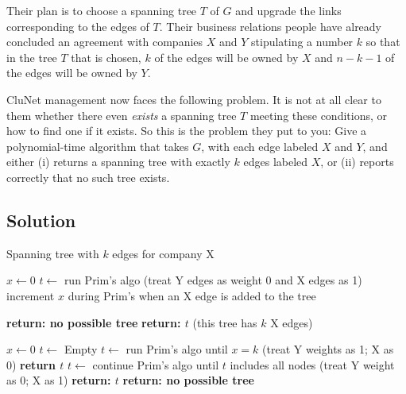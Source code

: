 \documentclass[11pt]{article}
\begin{document}
Their plan is to choose a spanning tree $T$ of $G$ and upgrade the links corresponding to the edges of $T$. Their business relations people have already concluded an agreement with companies $X$ and $Y$ stipulating a number $k$ so that in the tree $T$ that is chosen, $k$ of the edges will be owned by $X$ and $n-k-1$ of the edges will be owned by $Y$.

CluNet management now faces the following problem. It is not at all clear to them whether there even \textit{exists} a spanning tree $T$ meeting these conditions, or how to find one if it exists. So this is the problem they put to you: Give a polynomial-time algorithm that takes $G$, with each edge labeled $X$ and $Y$, and either (i) returns a spanning tree with exactly $k$ edges labeled $X$, or (ii) reports correctly that no such tree exists.

\subsection*{Solution}

\begin{algorithm}
    \caption{Spanning tree with $k$ edges for company X}
    \begin{algorithmic}[1]
        \STATE $x \gets 0$
        \STATE $t \gets $ run Prim's algo (treat Y edges as weight 0 and X edges as 1)
        \STATE increment $x$ during Prim's when an X edge is added to the tree
        
        \STATE
            \STATE \textbf{return: no possible tree}
        \ENDIF
            \STATE \textbf{return: $t$} (this tree has $k$ X edges)
        \ENDIF
        
            \STATE $x \gets 0$
            \STATE $t \gets$ Empty
            \STATE $t \gets$ run Prim's algo until $x = k$ (treat Y weights as 1; X as 0)
                \STATE \textbf{return $t$}
            \ELSE
                \STATE $t \gets$ continue Prim's algo until $t$ includes all nodes (treat Y weight as 0; X as 1)
                    \STATE \textbf{return: $t$}
                \ELSE
                    \STATE \textbf{return: no possible tree}
                \ENDIF
            \ENDIF
        \ENDIF
            
    \end{algorithmic}
\end{algorithm}
\end{document}
